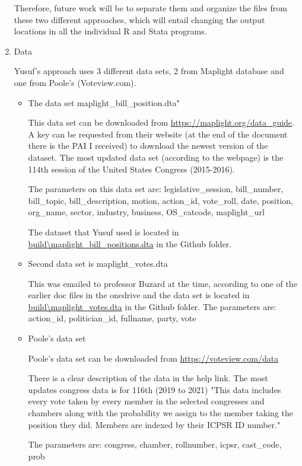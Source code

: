 \documentclass[a4paper,12pt]{article}
\begin{document}
\begin{enumerate}
Therefore, future work will be to separate them and organize the files from these two different approaches, which will entail changing the output locations in all the individual R and Stata programs. 



\item Data

Yusuf's approach uses 3 different data sets, 2 from Maplight database and one from Poole's (Voteview.com). 
\begin{itemize}
\item The data set maplight\_bill\_position.dta"

This data set can be downloaded from \url{https://maplight.org/data\_guide}. 
A key can be requested from their website (at the end of the document there is the PAI I received) to download the newest version of the dataset. 
The most updated data set (according to the webpage) is the 114th session of the United States Congress (2015-2016).

The parameters on this data set are:
legislative\_session, bill\_number, bill\_topic, bill\_description, motion, action\_id, vote\_roll, date, position, org\_name, sector, 
industry, business, OS\_catcode, maplight\_url

The dataset that Yusuf used is located in \url{build\maplight_bill_positions.dta} in the Github folder.

\item Second data set is maplight\_votes.dta

This was emailed to professor Buzard at the time, according to one of the earlier doc files in the onedrive and the data set is located in \url{build\maplight_votes.dta} in the Github folder. 
The parameters are: 
action\_id, politician\_id, fullname, party, vote

\item Poole’s data set 

Poole’s data set can be downloaded from \url{https://voteview.com/data}

There is a clear description of the data in the help link. 
The most updates congress data is for 116th (2019 to 2021)
"This data includes every vote taken by every member in the selected congresses and chambers along with the probability 
we assign to the member taking the position they did. Members are indexed by their ICPSR ID number."

The parameters are:
congress, chamber, rollnumber, icpsr, cast\_code, prob


\end{itemize}
\end{enumerate}
\end{document}

